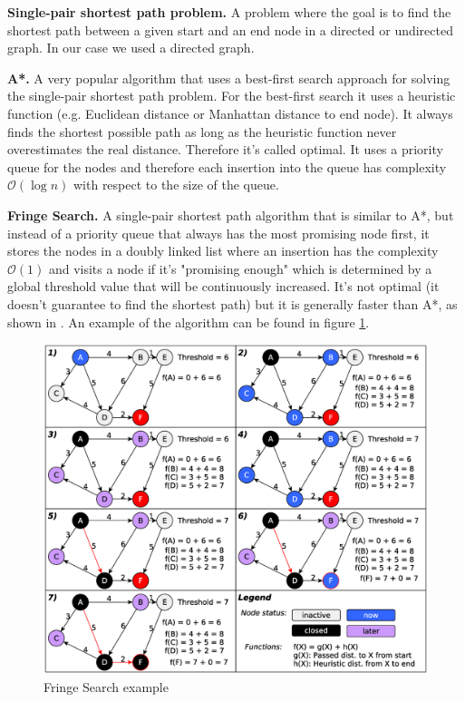 \documentclass[letterpaper]{article}
\newcommand{\mypar}[1]{{\bf #1.}}
\begin{document}
\mypar{Single-pair shortest path problem}
A problem where the goal is to find the shortest path between a given start and an end node in a directed or undirected graph. In our case we used a directed graph.

\mypar{A*}
A very popular algorithm that uses a best-first search approach for solving the single-pair shortest path problem. For the best-first search it uses a heuristic function (e.g. Euclidean distance or Manhattan distance to end node). It always finds the shortest possible path as long as the heuristic function never overestimates the real distance. Therefore it's called optimal. It uses a priority queue for the nodes and therefore each insertion into the queue has complexity $\mathcal{O}(\log n)$ with respect to the size of the queue.

\mypar{Fringe Search}
A single-pair shortest path algorithm that is similar to A*, but instead of a priority queue that always has the most promising node first, it stores the nodes in a doubly linked list where an insertion has the complexity $\mathcal{O}(1)$ and visits a node if it's "promising enough" which is determined by a global threshold value that will be continuously increased. It's not optimal (it doesn't guarantee to find the shortest path) but it is generally faster than A*, as shown in \cite{fringe:05}. An example of the algorithm can be found in figure \ref{fig:algo}.
\begin{figure}[h]\centering
  \includegraphics[scale=0.245]{fringe_rep.eps}
  \caption{Fringe Search example \label{fig:algo}}
\end{figure}
\end{document}
